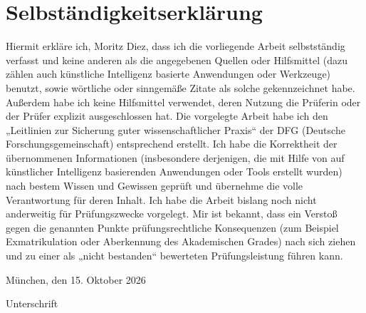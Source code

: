 \section*{Selbständigkeitserklärung}
{}

Hiermit erkläre ich, Moritz Diez, dass ich die vorliegende Arbeit selbstständig verfasst und
keine anderen als die angegebenen Quellen oder Hilfsmittel (dazu zählen auch
künstliche Intelligenz basierte Anwendungen oder Werkzeuge) benutzt, sowie
wörtliche oder sinngemäße Zitate als solche gekennzeichnet habe. Außerdem habe
ich keine Hilfsmittel verwendet, deren Nutzung die Prüferin oder der Prüfer
explizit ausgeschlossen hat. Die vorgelegte Arbeit habe ich den
„Leitlinien zur Sicherung guter wissenschaftlicher Praxis“ der DFG
(Deutsche Forschungsgemeinschaft) entsprechend erstellt. Ich habe die
Korrektheit der übernommenen Informationen (insbesondere derjenigen, die mit
Hilfe von auf künstlicher Intelligenz basierenden Anwendungen oder Tools
erstellt wurden) nach bestem Wissen und Gewissen geprüft und übernehme die
volle Verantwortung für deren Inhalt. Ich habe die Arbeit bislang noch nicht
anderweitig für Prüfungszwecke vorgelegt. Mir ist bekannt, dass ein Verstoß
gegen die genannten Punkte prüfungsrechtliche Konsequenzen (zum Beispiel
Exmatrikulation oder Aberkennung des Akademischen Grades) nach sich ziehen und
zu einer als „nicht bestanden“ bewerteten Prüfungsleistung führen kann.

\vspace{2.5cm}

\noindent
München, den 15. Oktober 2026
\hfill
\makebox[6cm]{\hrulefill}

\noindent
\hfill Unterschrift